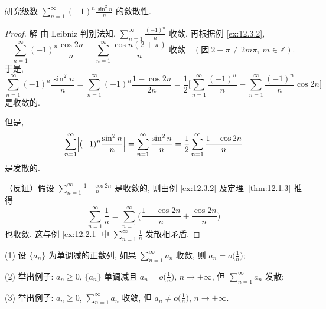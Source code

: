 \begin{example}\label{ex:12.3.4}
研究级数 $\sum_{n=1}^{\infty}(-1)^{n}\frac{\sin^{2}n}{n}$ 的敛散性.
\end{example}

\begin{proof}
解 由 Leibniz 判别法知, $\sum_{n=1}^{\infty}\frac{(-1)^{n}}{n}$ 收敛. 再根据例 \ref{ex:12.3.2},
\[
  \sum_{n=1}^{\infty}(-1)^{n}\frac{\cos 2n}{n}
  =\sum_{n=1}^{\infty}\frac{\cos n(2+\pi)}{n}\ \text{收敛}
  \quad(\text{因}\ 2+\pi\neq 2m\pi,\ m\in\mathbb{Z}).
\]
于是,
\[
  \sum_{n=1}^{\infty}(-1)^{n}\frac{\sin^{2}n}{n}
  =\sum_{n=1}^{\infty}(-1)^{n}\frac{1-\cos 2n}{2n}
  =\frac{1}{2}\biggl[\sum_{n=1}^{\infty}\frac{(-1)^{n}}{n}
  -\sum_{n=1}^{\infty}\frac{(-1)^{n}}{n}\cos 2n\biggr]
\]
是收敛的.

但是,
\[
  \sum_{n=1}^{\infty}\Bigl|(-1)^{n}\frac{\sin^{2}n}{n}\Bigr|
  =\sum_{n=1}^{\infty}\frac{\sin^{2}n}{n}
  =\frac{1}{2}\sum_{n=1}^{\infty}\frac{1-\cos 2n}{n}
\]
是发散的.

（反证）假设 $\sum_{n=1}^{\infty}\frac{1-\cos 2n}{n}$ 是收敛的, 则由例 \ref{ex:12.3.2} 及定理~\ref{thm:12.1.3} 推得
\[
  \sum_{n=1}^{\infty}\frac{1}{n}
  =\sum_{n=1}^{\infty}\biggl(\frac{1-\cos 2n}{n}+\frac{\cos 2n}{n}\biggr)
\]
也收敛. 这与例 \ref{ex:12.2.1} 中 $\sum_{n=1}^{\infty}\frac{1}{n}$ 发散相矛盾.
\end{proof}

\begin{example}\label{ex:12.3.5}
(1) 设 $\{a_{n}\}$ 为单调减的正数列, 如果 $\sum_{n=1}^{\infty}a_{n}$ 收敛, 则 $a_{n}=o\bigl(\frac{1}{n}\bigr)$;

(2) 举出例子: $a_{n}\geqslant0$, $\{a_{n}\}$ 单调减且 $a_{n}=o\bigl(\frac{1}{n}\bigr)$, $n\to+\infty$, 但 $\sum_{n=1}^{\infty}a_{n}$ 发散;

(3) 举出例子: $a_{n}\geqslant 0$, $\sum_{n=1}^{\infty}a_{n}$ 收敛, 但 $a_{n}\neq o\bigl(\frac{1}{n}\bigr)$, $n\to+\infty$.
\end{example}


